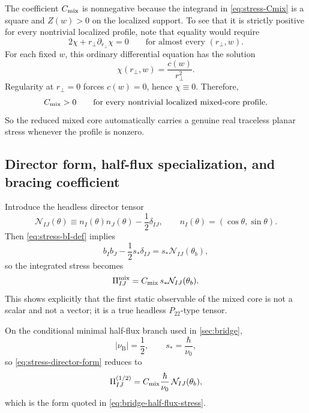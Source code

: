 \documentclass[11pt]{article}
\theoremstyle{plain}
\theoremstyle{definition}
\theoremstyle{remark}
\newcommand{\Ptwotwo}{P_{22}}
\newcommand{\nuB}{\nu_{\mathrm{B}}}
\begin{document}
The coefficient \(C_{\rm mix}\) is nonnegative because the integrand in \cref{eq:stress-Cmix} is a square and \(Z(w)>0\) on the localized support. To see that it is strictly positive for every nontrivial localized profile, note that equality would require
\begin{equation}
2\chi+r_\perp\partial_{r_\perp}\chi = 0
\qquad \text{for almost every }(r_\perp,w).
\label{eq:stress-zero-condition}
\end{equation}
For each fixed \(w\), this ordinary differential equation has the solution
\begin{equation}
\chi(r_\perp,w)=\frac{c(w)}{r_\perp^2}.
\label{eq:stress-zero-solution}
\end{equation}
Regularity at \(r_\perp=0\) forces \(c(w)=0\), hence \(\chi\equiv 0\). Therefore,
\begin{equation}
C_{\rm mix}>0
\qquad
\text{for every nontrivial localized mixed-core profile.}
\label{eq:stress-Cmix-positive}
\end{equation}
So the reduced mixed core automatically carries a genuine real traceless planar stress whenever the profile is nonzero.

\subsection{Director form, half-flux specialization, and bracing coefficient}\label{subsec:stress-director}

Introduce the headless director tensor
\begin{equation}
\mathcal N_{IJ}(\theta)
\equiv
n_I(\theta)n_J(\theta)-\frac12\delta_{IJ},
\qquad
n_I(\theta)=(\cos\theta,\sin\theta).
\label{eq:stress-director-tensor}
\end{equation}
Then \cref{eq:stress-bI-def} implies
\begin{equation}
b_Ib_J-\frac12s_*\delta_{IJ}
=
s_*\mathcal N_{IJ}(\theta_b),
\label{eq:stress-bI-director}
\end{equation}
so the integrated stress becomes
\begin{equation}
\Pi^{\rm mix}_{IJ}
=
C_{\rm mix}\,s_*\mathcal N_{IJ}(\theta_b).
\label{eq:stress-director-form}
\end{equation}
This shows explicitly that the first static observable of the mixed core is not a scalar and not a vector; it is a true headless \(\Ptwotwo\)-type tensor.

On the conditional minimal half-flux branch used in \cref{sec:bridge},
\begin{equation}
|\nuB|=\frac12,
\qquad
s_* = \frac{\hbar}{\nu_0},
\label{eq:stress-half-flux-specialization}
\end{equation}
so \cref{eq:stress-director-form} reduces to
\begin{equation}
\Pi^{(1/2)}_{IJ}
=
C_{\rm mix}\frac{\hbar}{\nu_0}\,\mathcal N_{IJ}(\theta_b),
\label{eq:stress-half-flux-result}
\end{equation}
which is the form quoted in \cref{eq:bridge-half-flux-stress}.
\end{document}

